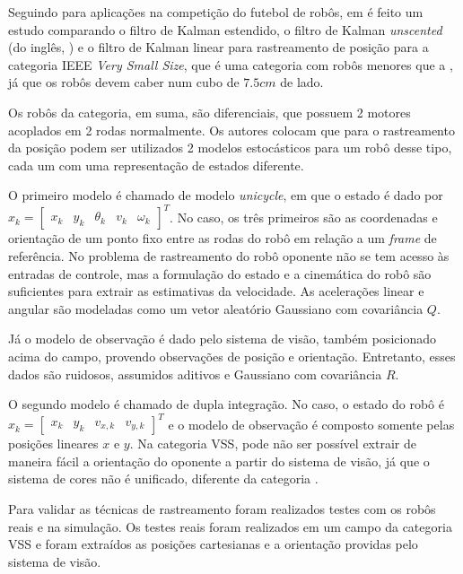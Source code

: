 \documentclass[acronym, symbols, table, deposito]{fei}
\begin{document}

Seguindo para aplicações na competição do futebol de robôs, em \textcite{aguiar2017kalman} é feito um estudo comparando o filtro de Kalman estendido, o filtro de Kalman \textit{unscented} (do inglês, ) e o filtro de Kalman linear para rastreamento de posição para a categoria IEEE \textit{Very Small Size}, que é uma categoria com robôs menores que a , já que os robôs devem caber num cubo de $7.5cm$ de lado.

Os robôs da categoria, em suma, são diferenciais, que possuem 2 motores acoplados em 2 rodas normalmente. Os autores colocam que para o rastreamento da posição podem ser utilizados 2 modelos estocásticos para um robô desse tipo, cada um com uma representação de estados diferente. 

O primeiro modelo é chamado de modelo \textit{unicycle}, em que o estado é dado por $x_k = \begin{bmatrix}
	x_k & y_k & \theta_k & v_k & \omega_k \end{bmatrix}^T$. No caso, os três primeiros são as coordenadas e orientação de um ponto fixo entre as rodas do robô em relação a um \textit{frame} de referência. No problema de rastreamento do robô oponente não se tem acesso às entradas de controle, mas a formulação do estado e a cinemática do robô são suficientes para extrair as estimativas da velocidade. As acelerações linear e angular são modeladas como um vetor aleatório Gaussiano com covariância $Q$.

Já o modelo de observação é dado pelo sistema de visão, também posicionado acima do campo, provendo observações de posição e orientação. Entretanto, esses dados são ruidosos, assumidos aditivos e Gaussiano com covariância $R$.

O segundo modelo é chamado de dupla integração. No caso, o estado do robô é $x_k = \begin{bmatrix} x_k & y_k & v_{x,k} & v_{y,k} \end{bmatrix}^T$ e o modelo de observação é composto somente pelas posições lineares $x$ e $y$. Na categoria VSS, pode não ser possível extrair de maneira fácil a orientação do oponente a partir do sistema de visão, já que o sistema de cores não é unificado, diferente da categoria .

Para validar as técnicas de rastreamento foram realizados testes com os robôs reais e na simulação. Os testes reais foram realizados em um campo da categoria VSS e foram extraídos as posições cartesianas e a orientação providas pelo sistema de visão.
\end{document}
